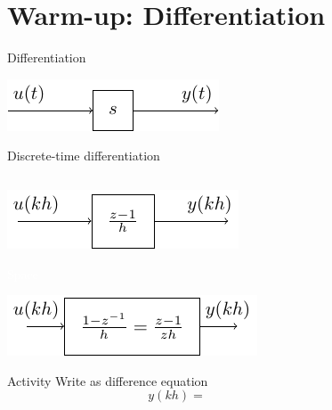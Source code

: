 \documentclass[presentation,aspectratio=1610]{beamer}
\begin{document}
\section{Warm-up: Differentiation}
\label{sec:orge452f6d}

\begin{frame}[label={sec:org21c3107}]{Differentiation}
\begin{center}
\includegraphics[width=0.5\linewidth]{../../figures/block-simple-derivative}
\end{center}
\end{frame}

\begin{frame}[label={sec:orgcb70291}]{Discrete-time differentiation}
\begin{columns}
\begin{column}{0.4\columnwidth}
\vspace*{5mm}

\includegraphics[width=\linewidth]{../../figures/block-simple-discrete-derivative-fwd-z}

\textcolor{white}{Space}

\begin{center}
\includegraphics[width=\linewidth]{../../figures/block-simple-discrete-derivative-z}
\end{center}

\alert{Activity} Write as difference equation \[ y(kh) = \] 
\end{column}
\begin{column}{0.6\columnwidth}
\end{column}
\end{columns}
\end{frame}
\end{document}
